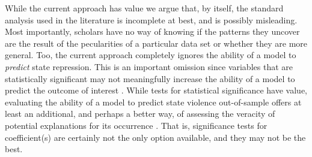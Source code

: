 \documentclass[12pt]{article}
\begin{document}
While the current approach has value we argue that, by itself, the standard analysis used in the literature is incomplete at best, and is possibly misleading. Most importantly, scholars have no way of knowing if the patterns they uncover are the result of the pecularities of a particular data set or whether they are more general. Too, the current approach completely ignores the ability of a model to {\em predict} state repression. This is an important omission since variables that are statistically significant may not meaningfully increase the ability of a model to predict the outcome of interest \citep{Wardetal2010}. While tests for statistical significance have value, evaluating the ability of a model to predict state violence out-of-sample offers at least an additional, and perhaps a better way, of assessing the veracity of potential explanations for its occurrence \citep[See, e.g.][]{BeckKingZeng2000}. That is, significance tests for coefficient(s) are certainly not the only option available, and they may not be the best. 
\end{document}
